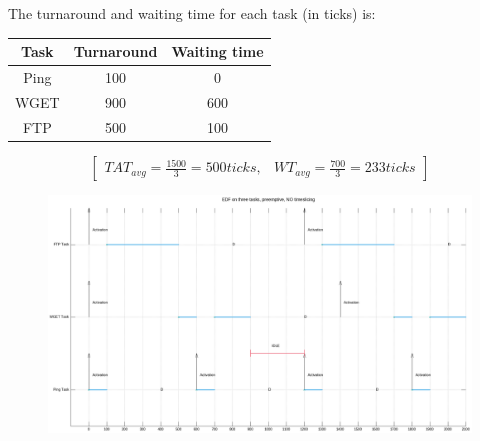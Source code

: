 \documentclass[10pt]{article}
\begin{document}
The turnaround and waiting time for each task (in ticks) is:
\begin{center}
\begin{tabular}{|c|c|c|}
\hline 
\rule[-1ex]{0pt}{2.5ex} Task & Turnaround & Waiting time \\ 
\hline 
\rule[-1ex]{0pt}{2.5ex} Ping & 100 & 0 \\ 
\hline 
\rule[-1ex]{0pt}{2.5ex} WGET & 900 & 600 \\ 
\hline 
\rule[-1ex]{0pt}{2.5ex} FTP & 500 & 100 \\ 
\hline 
\end{tabular} 
\end{center}
\[\begin{bmatrix}
TAT_{avg}=\frac{1500}{3}=500ticks, & WT_{avg}=\frac{700}{3}=233ticks
\end{bmatrix}\]

\begin{figure}[H]
    \centering
    \includegraphics[width=1.0\linewidth]{Pictures/EDFgantt.png}
    \caption{}
    \label{fig:12}
\end{figure}
\newpage
\end{document}
